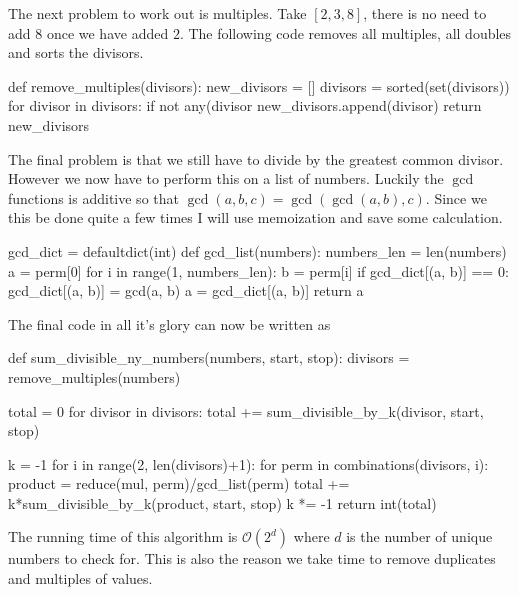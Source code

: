 The next problem to work out is multiples. Take $[2, 3, 8]$, there is no need to add $8$ once we have added $2$. The following code
removes all multiples, all doubles and sorts the divisors. 
%
\begin{pythoncode}
def remove_multiples(divisors):
    new_divisors = []
    divisors = sorted(set(divisors))
    for divisor in divisors:
        if not any(divisor %
            new_divisors.append(divisor)
    return new_divisors
\end{pythoncode}
%
The final problem is that we still have to divide by the greatest common divisor. However we now have to perform this on a list of numbers.
Luckily the $\gcd$ functions is additive so that $\gcd(a, b, c) = \gcd( \gcd(a, b), c)$. Since we this be done quite a few times
I will use memoization and save some calculation. 
%
\begin{pythoncode}
gcd_dict = defaultdict(int)
def gcd_list(numbers):
    numbers_len = len(numbers)
    a = perm[0]
    for i in range(1, numbers_len):
        b = perm[i]
        if gcd_dict[(a, b)] == 0:
            gcd_dict[(a, b)] = gcd(a, b)
        a = gcd_dict[(a, b)]
    return a
\end{pythoncode}
%
The final code in all it's glory can now be written as
%
\begin{pythoncode}
def sum_divisible_ny_numbers(numbers, start, stop):
    divisors = remove_multiples(numbers)

    total = 0
    for divisor in divisors:
        total += sum_divisible_by_k(divisor, start, stop)

    k = -1
    for i in range(2, len(divisors)+1):
        for perm in combinations(divisors, i):
            product = reduce(mul, perm)/gcd_list(perm)
            total += k*sum_divisible_by_k(product, start, stop)
        k *= -1
    return int(total)
\end{pythoncode}
%
The running time of this algorithm is $\mathcal{O}(2^{d})$ where $d$ is the number of unique numbers to check for. This is also the reason we take time to remove duplicates
and multiples of values. 

% 
% 